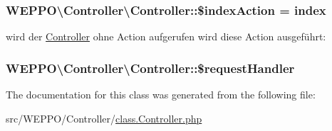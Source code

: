 \subsubsection[{\texorpdfstring{\$index\+Action}{$indexAction}}]{\setlength{\rightskip}{0pt plus 5cm}W\+E\+P\+P\+O\textbackslash{}\+Controller\textbackslash{}\+Controller\+::\$index\+Action = \textquotesingle{}index\textquotesingle{}\hspace{0.3cm}{\ttfamily [protected]}}\hypertarget{classWEPPO_1_1Controller_1_1Controller_a9b3514daa7cd3165920c2b9bdeef53bf}{}\label{classWEPPO_1_1Controller_1_1Controller_a9b3514daa7cd3165920c2b9bdeef53bf}
wird der \hyperlink{classWEPPO_1_1Controller_1_1Controller}{Controller} ohne Action aufgerufen wird diese Action ausgeführt\+: 
\subsubsection[{\texorpdfstring{\$request\+Handler}{$requestHandler}}]{\setlength{\rightskip}{0pt plus 5cm}W\+E\+P\+P\+O\textbackslash{}\+Controller\textbackslash{}\+Controller\+::\$request\+Handler\hspace{0.3cm}{\ttfamily [protected]}}\hypertarget{classWEPPO_1_1Controller_1_1Controller_ab0ddc5efebeac13fc91736e9ba521486}{}\label{classWEPPO_1_1Controller_1_1Controller_ab0ddc5efebeac13fc91736e9ba521486}


The documentation for this class was generated from the following file\+:\begin{DoxyCompactItemize}
\item 
src/\+W\+E\+P\+P\+O/\+Controller/\hyperlink{class_8Controller_8php}{class.\+Controller.\+php}\end{DoxyCompactItemize}
